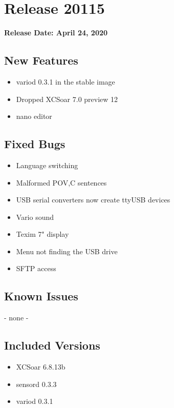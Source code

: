 \chapter*{Release 20115}

\begin{flushleft}
	\textbf{Release Date: April 24, 2020}
\end{flushleft}

\section*{New Features}

\begin{itemize}
	\item variod 0.3.1 in the stable image
	\item Dropped XCSoar 7.0 preview 12
	\item nano editor
\end{itemize}

\section*{Fixed Bugs}
\begin{itemize}
	\item Language switching
	\item Malformed POV,C sentences
	\item USB serial converters now create ttyUSB devices
	\item Vario sound
	\item Texim 7" display
	\item Menu not finding the USB drive
	\item SFTP access
\end{itemize}

\section*{Known Issues}
	- none -

\section*{Included Versions}

\begin{itemize}
	\item XCSoar 6.8.13b
	\item sensord 0.3.3
	\item variod 0.3.1
\end{itemize}
